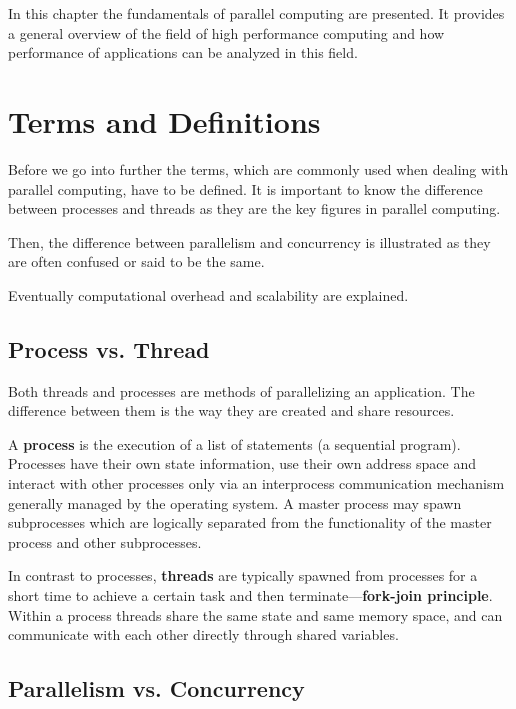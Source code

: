 In this chapter the fundamentals of parallel computing are
presented. It provides a general overview of the field of high
performance computing and how performance of applications can be
analyzed in this field.

\section{Terms and Definitions}
\label{sec:termsdef}


Before we go into further the terms, which are commonly used
when dealing with parallel computing, have to be
defined. It is important to know the difference between processes
and threads as they are the key figures in parallel computing.

Then, the difference between parallelism and concurrency is illustrated
as they are often confused or said to be the same.

Eventually
computational overhead and scalability are explained.


\subsection{Process vs. Thread}

Both threads and processes are methods of parallelizing an
application. The difference between them is the way they are
created and share resources.

A \textbf{process} is the execution of a list of statements (a sequential
program). Processes have their own state information, use their own 
address space and interact with other processes only via an
interprocess communication mechanism generally managed by the operating
system. A master process may spawn subprocesses which are logically
separated from the functionality of the master process and other
subprocesses.

In contrast to processes, \textbf{threads} are typically spawned from processes
for a short time to achieve a certain task and then
terminate---\textbf{fork-join principle}. Within a process threads 
share the same state and same memory space, and can communicate with
each other directly through shared variables.

\subsection{Parallelism vs. Concurrency}

